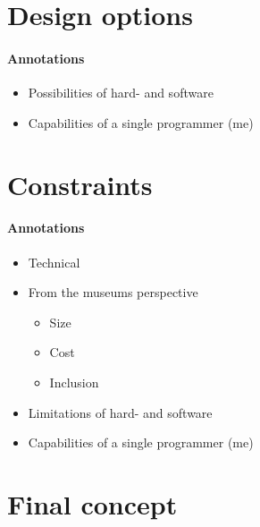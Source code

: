 
\section{Design options}
\label{conception_design}

\paragraph{Annotations}

\begin{itemize}
	\item Possibilities of hard- and software
	\item Capabilities of a single programmer (me)
\end{itemize}


\section{Constraints}
\label{conception_constraints}

\paragraph{Annotations}

\begin{itemize}
	\item Technical
	\item From the museums perspective
	\begin{itemize}
		\item Size
		\item Cost
		\item Inclusion
	\end{itemize}
	\item Limitations of hard- and software
	\item Capabilities of a single programmer (me)
\end{itemize}


\section{Final concept}
\label{conception_final}

